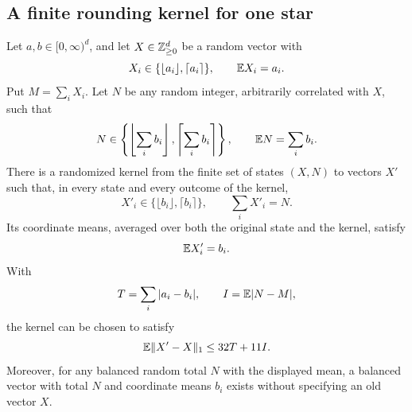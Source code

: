 \subsection{A finite rounding kernel for one star}

\begin{lemma}
\label{lem:rounding-star}
Let $a,b\in[0,\infty)^d$, and let $X\in\mathbb Z_{\ge0}^d$ be a random vector with
\[
 X_i\in\{\lfloor a_i\rfloor,\lceil a_i\rceil\},
 \qquad \mathbb E X_i=a_i.
\]
Put $M=\sum_iX_i$.  Let $N$ be any random integer, arbitrarily correlated with
$X$, such that
\[
 N\in\left\{\left\lfloor\sum_i b_i\right\rfloor,
                 \left\lceil\sum_i b_i\right\rceil\right\},
 \qquad \mathbb E N=\sum_i b_i.
\]
There is a randomized kernel from the finite set of states $(X,N)$ to vectors
$X'$ such that, in every state and every outcome of the kernel,
\[
 X'_i\in\{\lfloor b_i\rfloor,\lceil b_i\rceil\},
 \qquad \sum_iX'_i=N.
\]
Its coordinate means, averaged over both the original state and the kernel,
satisfy
\[
                         \mathbb E X'_i=b_i.
\]
With
\[
 T=\sum_i|a_i-b_i|,
 \qquad I=\mathbb E|N-M|,
\]
the kernel can be chosen to satisfy
\begin{equation}\label{eq:rounding-star-bound}
             \mathbb E\|X'-X\|_1\le32T+11I.
\end{equation}
Moreover, for any balanced random total $N$ with the displayed mean, a balanced
vector with total $N$ and coordinate means $b_i$ exists without specifying an
old vector $X$.
\end{lemma}

